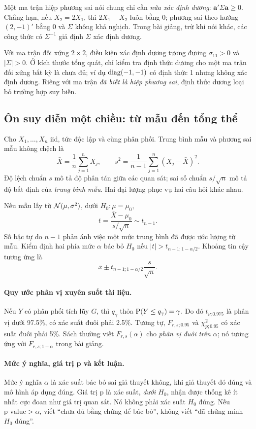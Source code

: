 Một ma trận hiệp phương sai nói chung chỉ cần \emph{nửa xác định dương}:
$\mathbf a'\Sigma\mathbf a\ge0$. Chẳng hạn, nếu $X_2=2X_1$, thì
$2X_1-X_2$ luôn bằng 0; phương sai theo hướng $(2,-1)'$ bằng 0 và $\Sigma$
không khả nghịch. Trong bài giảng, trừ khi nói khác, các công thức có
$\Sigma^{-1}$ giả định $\Sigma$ xác định dương.

Với ma trận đối xứng $2\times2$, điều kiện xác định dương tương đương
$\sigma_{11}>0$ và $|\Sigma|>0$. Ở kích thước tổng quát, chỉ kiểm tra định
thức dương cho một ma trận đối xứng bất kỳ là chưa đủ; ví dụ $\operatorname{diag}(-1,-1)$
có định thức 1 nhưng không xác định dương. Riêng với ma trận \emph{đã biết là
hiệp phương sai}, định thức dương loại bỏ trường hợp suy biến.

\subsection{Ôn suy diễn một chiều: từ mẫu đến tổng thể}
Cho $X_1,\ldots,X_n$ iid, tức độc lập và cùng phân phối. Trung bình mẫu và
phương sai mẫu không chệch là
\[
 \bar X=\frac1n\sum_{j=1}^n X_j,\qquad
 s^2=\frac1{n-1}\sum_{j=1}^n(X_j-\bar X)^2.
\]
Độ lệch chuẩn $s$ mô tả độ phân tán giữa các quan sát; sai số chuẩn
$s/\sqrt n$ mô tả độ bất định của \emph{trung bình mẫu}. Hai đại lượng
phục vụ hai câu hỏi khác nhau.

Nếu mẫu lấy từ $\mathcal N(\mu,\sigma^2)$, dưới $H_0:\mu=\mu_0$,
\[
 t=\frac{\bar X-\mu_0}{s/\sqrt n}\sim t_{n-1}.
\]
Số bậc tự do $n-1$ phản ánh việc một mức trung bình đã được ước lượng từ mẫu.
Kiểm định hai phía mức $\alpha$ bác bỏ $H_0$ nếu
$|t|>t_{n-1;1-\alpha/2}$. Khoảng tin cậy tương ứng là
\[
 \bar x\pm t_{n-1;1-\alpha/2}\frac{s}{\sqrt n}.
\]

\paragraph{Quy ước phân vị xuyên suốt tài liệu.}
Nếu $Y$ có phân phối tích lũy $G$, thì $q_\gamma$ thỏa
$\operatorname{P}(Y\le q_\gamma)=\gamma$. Do đó $t_{\nu;0.975}$ là phân vị dưới
97.5\%, có xác suất đuôi phải 2.5\%. Tương tự,
$F_{r,s;0.95}$ và $\chi^2_{p;0.95}$ có xác suất đuôi phải 5\%.
Sách thường viết $F_{r,s}(\alpha)$ cho \emph{phân vị đuôi trên}
$\alpha$; nó tương ứng với $F_{r,s;1-\alpha}$ trong bài giảng.

\paragraph{Mức ý nghĩa, giá trị p và kết luận.}
Mức ý nghĩa $\alpha$ là xác suất bác bỏ sai giả thuyết không, khi giả thuyết
đó đúng và mô hình áp dụng đúng. Giá trị p là xác suất, \emph{dưới $H_0$},
nhận được thống kê ít nhất cực đoan như giá trị quan sát. Nó không phải
xác suất $H_0$ đúng. Nếu $\text{p-value}>\alpha$, viết ``chưa đủ bằng chứng
để bác bỏ'', không viết ``đã chứng minh $H_0$ đúng''.

